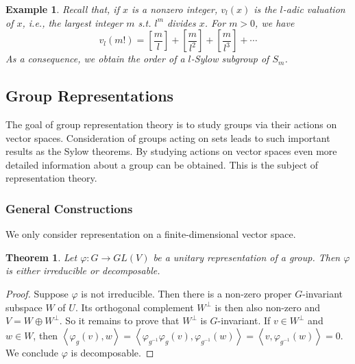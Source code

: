 \documentclass{article}
\newtheorem{Thm}{Theorem}[section]
\newtheorem{Eg}{Example}[section]
\theoremstyle{definition}
\begin{document}
\begin{Eg}
    Recall that, if $x$ is a nonzero integer, $v_l(x)$ is the $l$-adic valuation of $x$, i.e., the largest integer $m$ s.t. $l^m$ divides $x$.
For $m>0$, we have \begin{equation*}
    v_l(m!)=[\frac{m}{l}]+[\frac{m}{l^2}]+[\frac{m}{l^3}]+\cdots
\end{equation*}
As a consequence, we obtain the order of a $l$-Sylow subgroup of $S_m$.
\end{Eg}


\subsection{Group Representations}
The goal of group representation theory is to study groups via their actions on vector spaces. Consideration of groups acting on sets leads to such important results as the Sylow theorems.
By studying actions on vector spaces even more detailed information about a group can be obtained. This is the subject of representation theory.
\subsubsection{General Constructions}
We only consider representation on a finite-dimensional vector space.
\begin{Thm}
    Let $\varphi:G\to GL(V)$ be a unitary representation of a group. Then $\varphi$ is either irreducible or decomposable.
\end{Thm}
\begin{proof}
    Suppose $\varphi$ is not irreducible. Then there is a non-zero proper $G$-invariant subspace $W$ of $U$. Its orthogonal complement $W^\perp$ is then also non-zero and $V=W\oplus W^\perp$.
So it remains to prove that $W^\perp$ is $G$-invariant. If $v\in W^\perp$ and $w\in W$, then $\left\langle\varphi_g(v),w\right\rangle=\left\langle\varphi_{g^{-1}}\varphi_g(v),\varphi_{g^{-1}}(w)\right\rangle=\left\langle v,\varphi_{g^{-1}}(w)\right\rangle=0$.
We conclude $\varphi$ is decomposable.
\end{proof}
\end{document}
